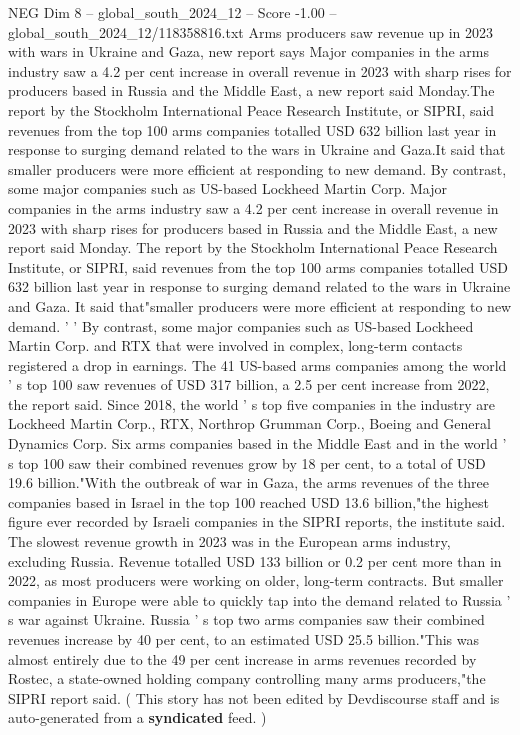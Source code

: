 \begin{textsample}{NEG Dim 8 – global\_south\_2024\_12 – Score -1.00 – global\_south\_2024\_12/118358816.txt}  \label{ex:f8_neg_380}
Arms producers saw revenue up in 2023 with wars in Ukraine and Gaza, new report says Major companies in the arms industry saw a 4.2 per cent increase in overall revenue in 2023 with sharp rises for producers based in Russia and the Middle East, a new report said Monday.The report by the Stockholm International Peace Research Institute, or SIPRI, said revenues from the top 100 arms companies totalled USD 632 billion last year in response to surging demand related to the wars in Ukraine and Gaza.It said that smaller producers were more efficient at responding to new demand.
By contrast, some major companies such as US-based Lockheed Martin Corp.
Major companies in the arms industry saw a 4.2 per cent increase in overall revenue in 2023 with sharp rises for producers based in Russia and the Middle East, a new report said Monday.
The report by the Stockholm International Peace Research Institute, or SIPRI, said revenues from the top 100 arms companies totalled USD 632 billion last year in response to surging demand related to the wars in Ukraine and Gaza.
It said that"smaller producers were more efficient at responding to new demand. ' ' By contrast, some major companies such as US-based Lockheed Martin Corp. and RTX that were involved in complex, long-term contacts registered a drop in earnings.
The 41 US-based arms companies among the world ' s top 100 saw revenues of USD 317 billion, a 2.5 per cent increase from 2022, the report said.
Since 2018, the world ' s top five companies in the industry are Lockheed Martin Corp., RTX, Northrop Grumman Corp., Boeing and General Dynamics Corp.
Six arms companies based in the Middle East and in the world ' s top 100 saw their combined revenues grow by 18 per cent, to a total of USD 19.6 billion."With the outbreak of war in Gaza, the arms revenues of the three companies based in Israel in the top 100 reached USD 13.6 billion,"the highest figure ever recorded by Israeli companies in the SIPRI reports, the institute said.
The slowest revenue growth in 2023 was in the European arms industry, excluding Russia.
Revenue totalled USD 133 billion or 0.2 per cent more than in 2022, as most producers were working on older, long-term contracts.
But smaller companies in Europe were able to quickly tap into the demand related to Russia ' s war against Ukraine.
Russia ' s top two arms companies saw their combined revenues increase by 40 per cent, to an estimated USD 25.5 billion."This was almost entirely due to the 49 per cent increase in arms revenues recorded by Rostec, a state-owned holding company controlling many arms producers,"the SIPRI report said. ( This story has not been edited by Devdiscourse staff and is auto-generated from a \textbf{syndicated} feed. )

\end{textsample}
